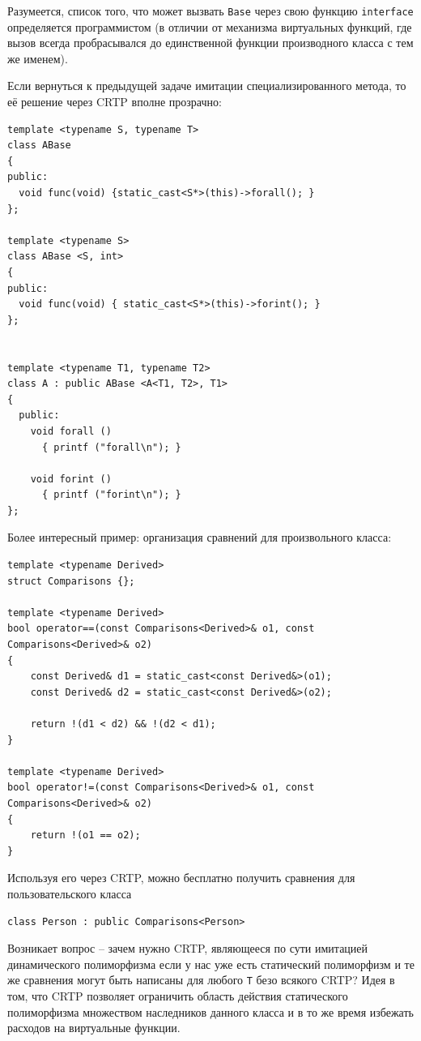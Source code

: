 \documentclass[a4paper,12pt,oneside]{article}
\begin{document}
Разумеется, список того, что может вызвать \lstinline!Base! через свою функцию \lstinline!interface! определяется программистом (в отличии от механизма виртуальных функций, где вызов всегда пробрасывался до единственной функции производного класса с тем же именем).

Если вернуться к предыдущей задаче имитации специализированного метода, то её решение через CRTP вполне прозрачно:

\begin{lstlisting}
template <typename S, typename T>
class ABase
{
public:
  void func(void) {static_cast<S*>(this)->forall(); }
};

template <typename S>
class ABase <S, int>
{
public:
  void func(void) { static_cast<S*>(this)->forint(); }
};


template <typename T1, typename T2>
class A : public ABase <A<T1, T2>, T1>
{
  public:
    void forall ()
      { printf ("forall\n"); }

    void forint ()
      { printf ("forint\n"); }
};
\end{lstlisting}

Более интересный пример: организация сравнений для произвольного класса:

\begin{lstlisting}
template <typename Derived>
struct Comparisons {};

template <typename Derived>
bool operator==(const Comparisons<Derived>& o1, const Comparisons<Derived>& o2)
{
    const Derived& d1 = static_cast<const Derived&>(o1);
    const Derived& d2 = static_cast<const Derived&>(o2);

    return !(d1 < d2) && !(d2 < d1);
}

template <typename Derived>
bool operator!=(const Comparisons<Derived>& o1, const Comparisons<Derived>& o2)
{
    return !(o1 == o2);
}
\end{lstlisting}

Используя его через CRTP, можно бесплатно получить сравнения для пользовательского класса

\begin{lstlisting}
class Person : public Comparisons<Person>
\end{lstlisting}

Возникает вопрос -- зачем нужно CRTP, являющееся по сути имитацией динамического полиморфизма если у нас уже есть статический полиморфизм и те же сравнения могут быть написаны для любого \lstinline!T! безо всякого CRTP? Идея в том, что CRTP позволяет ограничить область действия статического полиморфизма множеством наследников данного класса и в то же время избежать расходов на виртуальные функции.
\end{document}
